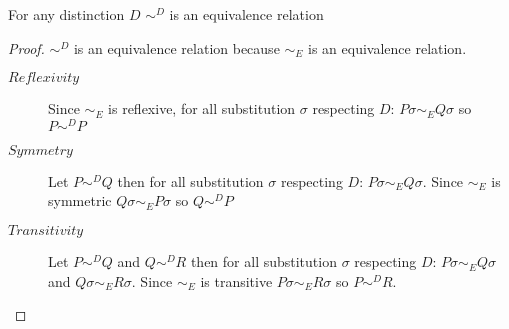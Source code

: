  
\begin{lemma}\label{strongDEquivalenceIsAnEquivalence}
  For any distinction $D$ $\sim^{D}$ is an equivalence relation
  \begin{proof}
    $\sim^{D}$ is an equivalence relation because $\sim_{E}$ is an equivalence relation.
    \begin{description}
      \item[$Reflexivity$]
	Since $\sim_{E}$ is reflexive, for all substitution $\sigma$ respecting $D$: $P\sigma \sim_{E} Q\sigma$ so $P \sim^{D} P$
      \item[$Symmetry$]
	Let $P \sim^{D} Q$ then for all substitution $\sigma$ respecting $D$: $P\sigma \sim_{E} Q\sigma$. Since $\sim_{E}$ is symmetric $Q\sigma \sim_{E} P\sigma$ so $Q \sim^{D} P$
      \item[$Transitivity$]
	Let $P \sim^{D} Q$ and $Q \sim^{D} R$ then for all substitution $\sigma$ respecting $D$: $P\sigma \sim_{E} Q\sigma$ and $Q\sigma \sim_{E} R\sigma$. Since $\sim_{E}$ is transitive $P\sigma \sim_{E} R\sigma$ so $P \sim^{D} R$.
    \end{description}
  \end{proof}
\end{lemma}

% 


